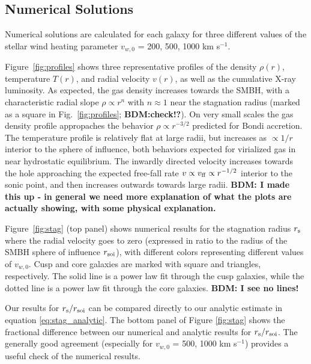 \documentclass[usenatbib,fleqn]{mn2e}
\begin{document}

\subsection{Numerical Solutions}

Numerical solutions are calculated for each galaxy for three different values of the stellar wind heating parameter $v_{w,0}$ = 200, 500, 1000 km s$^{-1}$.  

Figure~\ref{fig:profiles} shows three representative profiles of the density $\rho(r)$, temperature $T(r)$, and radial velocity $v(r)$, as well as the cumulative X-ray luminosity.  As expected, the gas density increases towards the SMBH, with a characteristic radial slope $\rho \propto r^{n}$ with $n \approx 1$ near the stagnation radius (marked as a square in Fig.~\ref{fig:profiles}; {\bf BDM:check!?}).  On very small scales the gas density profile appropaches the behavior $\rho \propto r^{-3/2}$ predicted for Bondi accretion.  The temperature profile is relatively flat at large radii, but increases as $\propto 1/r$ interior to the sphere of influence, both behaviors expected for virialized gas in near hydrostatic equilibrium.  The inwardly directed velocity increases towards the hole approaching the expected free-fall rate $v \propto v_{\rm ff}\propto r^{-1/2}$ interior to the sonic point, and then increases outwards towards large radii. {\bf BDM: I made this up - in general we need more explanation of what the plots are actually showing, with some physical explanation.}

Figure~\ref{fig:stag} (top panel) shows numerical results for the stagnation radius $r_{\rm s}$ where the radial velocity goes to zero (expressed in ratio to the radius of the SMBH sphere of influence $r_{\rm soi}$), with different colors representing different values of $v_{w,0}$.  Cusp and core galaxies are marked with square and triangles, respectively.  The solid line is a power law fit through the cusp galaxies, while the dotted line is a power law fit through the core galaxies.  {\bf BDM: I see no lines!}

Our results for $r_{\rm s}/r_{\rm soi}$ can be compared directly to our analytic estimate in equation \ref{eq:stag_analytic}.  The bottom panel of Figure \ref{fig:stag} shows the fractional difference between our numerical and analytic results for $r_{\rm s}/r_{\rm soi}$.  The generally good agreement (especially for $v_{w,0}$ = 500, 1000 km s$^{-1}$) provides a useful check of the numerical results.
\end{document}
